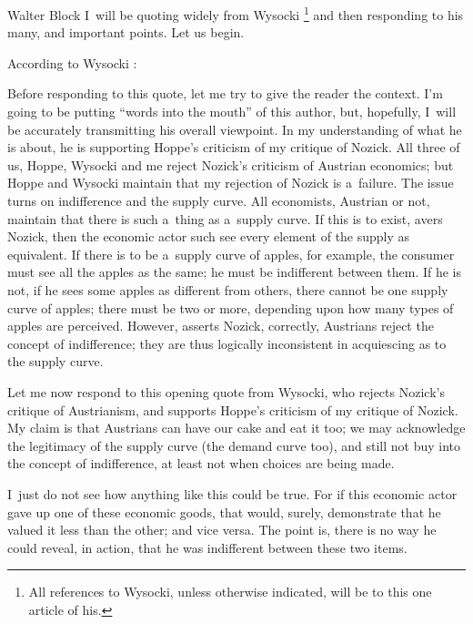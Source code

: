 \begin{artengenv}{Walter Block}
I~will be quoting widely from Wysocki
\parencite*[][]{wysocki_problem_2021}%
\footnote{All references to Wysocki, unless otherwise indicated, will be to this one article of his.} and then responding to his many, and important points. Let us begin.

According to Wysocki
\parencite*[][]{wysocki_problem_2021}:%



Before responding to this quote, let me try to give the reader the context. I'm going to be putting ``words into the mouth'' of this author, but, hopefully, I~will be accurately transmitting his overall viewpoint. In my understanding of what he is about, he is supporting Hoppe's criticism of my critique of Nozick. All three of us, Hoppe, Wysocki and me reject Nozick's criticism of Austrian economics; but Hoppe and Wysocki maintain that my rejection of Nozick is a~failure. The issue turns on indifference and the supply curve. All economists, Austrian or not, maintain that there is such a~thing as a~supply curve. If this is to exist, avers Nozick, then the economic actor such see every element of the supply as equivalent. If there is to be a~supply curve of apples, for example, the consumer must see all the apples as the same; he must be indifferent between them. If he is not, if he sees some apples as different from others, there cannot be one supply curve of apples; there must be two or more, depending upon how many types of apples are perceived. However, asserts Nozick, correctly, Austrians reject the concept of indifference; they are thus logically inconsistent in acquiescing as to the supply curve.

Let me now respond to this opening quote from Wysocki, who rejects Nozick's critique of Austrianism, and supports Hoppe's criticism of my critique of Nozick. My claim is that Austrians can have our cake and eat it too; we may acknowledge the legitimacy of the supply curve (the demand curve too), and still not buy into the concept of indifference, at least not when choices are being made.

I~just do not see how anything like this could be true. For if this economic actor gave up one of these economic goods, that would, surely, demonstrate
\parencite[][]{rothbard_toward_2011} %
 that he valued it less than the other; and vice versa. The point is, there is no way he could reveal, in action, that he was indifferent between these two items.


\end{artengenv}
